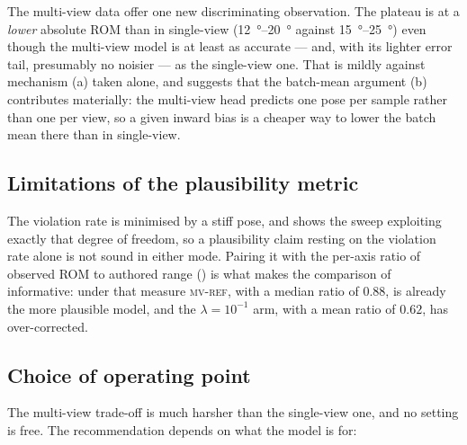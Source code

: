 \documentclass[11pt,a4paper]{article}
\newcommand{\lam}{\lambda}
\newcommand{\armref}{\textsc{mv-ref}}
\begin{document}
The multi-view data offer one new discriminating observation. The plateau is at
a \emph{lower} absolute ROM than in single-view (\SIrange{12}{20}{\degree}
against \SIrange{15}{25}{\degree}) even though the multi-view model is at least
as accurate --- and, with its lighter error tail, presumably no noisier --- as
the single-view one. That is
mildly against mechanism (a) taken alone, and suggests that the batch-mean
argument (b) contributes materially: the multi-view head predicts one pose per
sample rather than one per view, so a given inward bias is a cheaper way to
lower the batch mean there than in single-view.

\subsection{Limitations of the plausibility metric}

The violation rate is minimised by a stiff pose, and  shows
the sweep exploiting exactly that degree of freedom, so a plausibility claim
resting on the violation rate alone is not sound in either mode. Pairing it
with the per-axis ratio of observed ROM to authored range ()
is what makes the comparison of  informative: under that
measure \armref{}, with a median ratio of $0.88$, is already the
more plausible model, and the $\lam = 10^{-1}$ arm, with a mean ratio of
$0.62$, has over-corrected.

\subsection{Choice of operating point}

The multi-view trade-off is much harsher than the single-view one, and no
setting is free. The recommendation depends on what the model is for:
\end{document}
